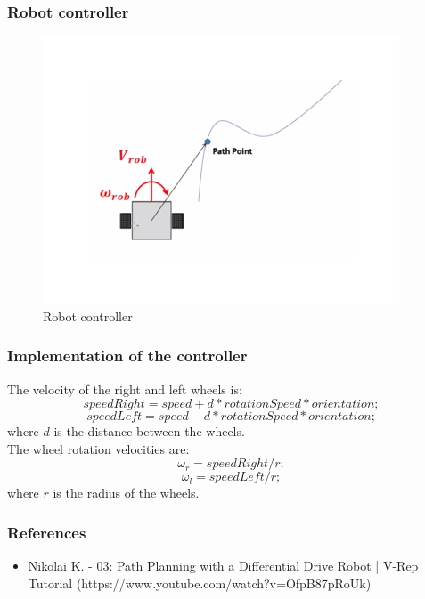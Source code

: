 \documentclass{beamer}
\begin{document}
	\begin{frame}
		\frametitle{Robot controller}
		\begin{figure}
			\includegraphics[scale=0.5]{controller}
			\caption{Robot controller}
		\end{figure}
	\end{frame}
	
	\begin{frame}
		\frametitle{Implementation of the controller}
		The velocity of the right and left wheels is:
		\begin{equation}
		speedRight = speed + d * rotationSpeed * orientation;
		\end{equation}
		\begin{equation}
		speedLeft = speed - d * rotationSpeed * orientation;
		\end{equation}
		where $d$ is the distance between the wheels. \\
		The wheel rotation velocities are:
		\begin{equation}
		\omega_r = speedRight / r;
		\end{equation}
		\begin{equation}
		\omega_l = speedLeft / r;
		\end{equation}
		where $r$ is the radius of the wheels.
	\end{frame}
	
	\begin{frame}
		\frametitle{References}
		\begin{itemize}
			\item Nikolai K. - 03: Path Planning with a Differential Drive Robot | V-Rep Tutorial (https://www.youtube.com/watch?v=OfpB87pRoUk)
		\end{itemize}
	\end{frame}
\end{document}
